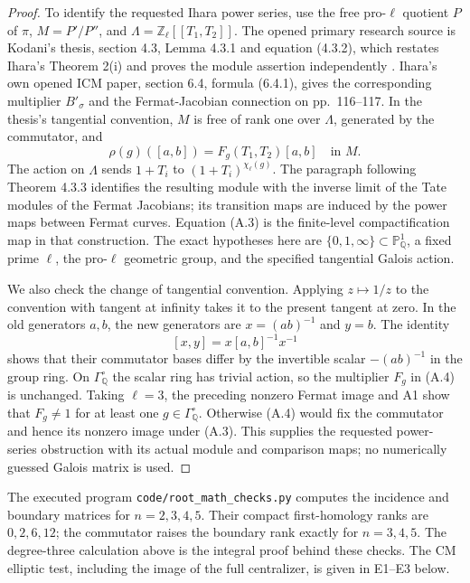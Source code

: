 \begin{proof}
To identify the requested Ihara power series, use the free pro-$\ell$ quotient $P$ of $\pi$, $M=P'/P''$, and $\Lambda=\mathbb Z_\ell[[T_1,T_2]]$. The opened primary research source is Kodani's thesis, section 4.3, Lemma 4.3.1 and equation (4.3.2), which restates Ihara's Theorem 2(i) and proves the module assertion independently \cite{Kodani2017,Ihara1991}. Ihara's own opened ICM paper, section 6.4, formula (6.4.1), gives the corresponding multiplier $B'_\sigma$ and the Fermat-Jacobian connection on pp.~116--117. In the thesis's tangential convention, $M$ is free of rank one over $\Lambda$, generated by the commutator, and
\[
 \rho(g)([a,b])=F_g(T_1,T_2)[a,b]\quad\text{in }M.
 \tag{A.4}
\]
The action on $\Lambda$ sends $1+T_i$ to $(1+T_i)^{\chi_\ell(g)}$. The paragraph following Theorem 4.3.3 identifies the resulting module with the inverse limit of the Tate modules of the Fermat Jacobians; its transition maps are induced by the power maps between Fermat curves. Equation (A.3) is the finite-level compactification map in that construction. The exact hypotheses here are $\{0,1,\infty\}\subset\mathbb P^1_{\mathbb Q}$, a fixed prime $\ell$, the pro-$\ell$ geometric group, and the specified tangential Galois action.

We also check the change of tangential convention. Applying $z\mapsto1/z$ to the convention with tangent at infinity takes it to the present tangent at zero. In the old generators $a,b$, the new generators are $x=(ab)^{-1}$ and $y=b$. The identity
\[
 [x,y]=x[a,b]^{-1}x^{-1}
\]
shows that their commutator bases differ by the invertible scalar $-(ab)^{-1}$ in the group ring. On $\Gamma_{\mathbb Q}^{\circ}$ the scalar ring has trivial action, so the multiplier $F_g$ in (A.4) is unchanged. Taking $\ell=3$, the preceding nonzero Fermat image and A1 show that $F_g\ne1$ for at least one $g\in\Gamma_{\mathbb Q}^{\circ}$. Otherwise (A.4) would fix the commutator and hence its nonzero image under (A.3). This supplies the requested power-series obstruction with its actual module and comparison maps; no numerically guessed Galois matrix is used.
\end{proof}

The executed program \texttt{code/root\_math\_checks.py} computes the incidence and boundary matrices for $n=2,3,4,5$. Their compact first-homology ranks are $0,2,6,12$; the commutator raises the boundary rank exactly for $n=3,4,5$. The degree-three calculation above is the integral proof behind these checks. The CM elliptic test, including the image of the full centralizer, is given in E1--E3 below.
